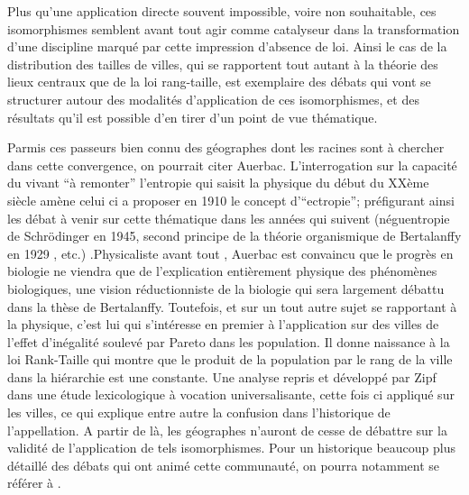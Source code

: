 {Plus qu'une application directe souvent impossible, voire non souhaitable, ces isomorphismes semblent avant tout agir comme catalyseur dans la transformation d'une discipline marqué par cette impression d'absence de loi. Ainsi le cas de la distribution des tailles de villes, qui se rapportent tout autant à la théorie des lieux centraux que de la loi rang-taille, est exemplaire des débats qui vont se structurer autour des modalités d'application de ces isomorphismes, et des résultats qu'il est possible d'en tirer d'un point de vue thématique. 

Parmis ces passeurs bien connu des géographes dont les racines sont à chercher dans cette convergence, on pourrait citer Auerbac. L'interrogation sur la capacité du vivant \enquote{à remonter} l'entropie qui saisit la physique du début du XXème siècle amène celui ci a proposer en 1910 le concept d'\enquote{ectropie}; préfigurant ainsi les débat à venir sur cette thématique dans les années qui suivent (néguentropie de Schrödinger en 1945, second principe de la théorie organismique de Bertalanffy en 1929 \autocite[475]{Pouvreau2013}, etc.) \autocite[80]{Pouvreau2013}.Physicaliste avant tout \autocite[87]{Pouvreau2013}, Auerbac est convaincu que le progrès en biologie ne viendra que de l'explication entièrement physique des phénomènes biologiques, une vision réductionniste de la biologie qui sera largement débattu dans la thèse de Bertalanffy. Toutefois, et sur un tout autre sujet se rapportant à la physique, c'est lui qui s’intéresse en premier à l'application sur des villes de l'effet d'inégalité soulevé par Pareto dans les population.\autocite[94]{Rosser2011} Il donne naissance à la loi Rank-Taille qui montre que le produit de la population par le rang de la ville dans la hiérarchie est une constante. Une analyse repris et développé par Zipf dans une étude lexicologique à vocation universalisante, cette fois ci appliqué sur les villes, ce qui explique entre autre la confusion dans l’historique de l’appellation. A partir de là, les géographes n'auront de cesse de débattre sur la validité de l'application de tels isomorphismes. Pour un historique beaucoup plus détaillé des débats qui ont animé cette communauté, on pourra notamment se référer à \textcite{Pumain1982}.


}
